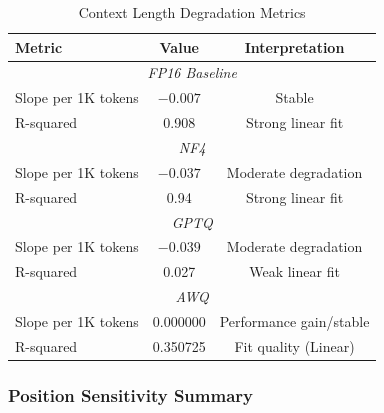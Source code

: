 \begin{table}[h]
\centering
\caption{Context Length Degradation Metrics}
\label{tab:degradation}
\begin{tabular}{@{}lcc@{}}
\toprule
\textbf{Metric} & \textbf{Value} & \textbf{Interpretation} \\
\midrule
\multicolumn{3}{c}{\textit{FP16 Baseline}} \\
\midrule
Slope per 1K tokens & $-0.007$ & Stable \\
R-squared & 0.908 & Strong linear fit \\
\midrule
\multicolumn{3}{c}{\textit{NF4}} \\
\midrule
Slope per 1K tokens & $-0.037$ & Moderate degradation \\
R-squared & 0.94 & Strong linear fit \\
\midrule
\multicolumn{3}{c}{\textit{GPTQ}} \\
\midrule
Slope per 1K tokens & $-0.039$ & Moderate degradation \\
R-squared & 0.027 & Weak linear fit \\
\midrule
\multicolumn{3}{c}{\textit{AWQ}} \\
\midrule
Slope per 1K tokens & 0.000000 & Performance gain/stable \\
R-squared & 0.350725  & Fit quality (Linear) \\
\bottomrule
\end{tabular}
\end{table}

\newpage
\subsubsection{Position Sensitivity Summary}

